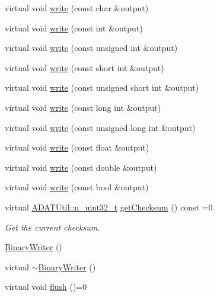 \begin{DoxyCompactItemize}
\item 
virtual void \mbox{\hyperlink{classADATIO_1_1BinaryWriter_aff26660b47d90f1ccfcd8ae06888d95b}{write}} (const char \&output)
\item 
virtual void \mbox{\hyperlink{classADATIO_1_1BinaryWriter_aa7f3e0aa4623cb869b521030d2d1dc06}{write}} (const int \&output)
\item 
virtual void \mbox{\hyperlink{classADATIO_1_1BinaryWriter_a6d173f658b059805cf3d0fdc12a11191}{write}} (const unsigned int \&output)
\item 
virtual void \mbox{\hyperlink{classADATIO_1_1BinaryWriter_a3a4912b7ed1a8ffffdf4e0aa3f19e7fe}{write}} (const short int \&output)
\item 
virtual void \mbox{\hyperlink{classADATIO_1_1BinaryWriter_a2ef22023354822ab259877e9649a5dd9}{write}} (const unsigned short int \&output)
\item 
virtual void \mbox{\hyperlink{classADATIO_1_1BinaryWriter_a7d3cf1640580585b50d633721be0fc53}{write}} (const long int \&output)
\item 
virtual void \mbox{\hyperlink{classADATIO_1_1BinaryWriter_a910c693d6cf8cc4c15594d5204f2d313}{write}} (const unsigned long int \&output)
\item 
virtual void \mbox{\hyperlink{classADATIO_1_1BinaryWriter_ab4d21b75feacec9d85dee103d98665e0}{write}} (const float \&output)
\item 
virtual void \mbox{\hyperlink{classADATIO_1_1BinaryWriter_a8f0cf8c22a53f003ff011b668f346b57}{write}} (const double \&output)
\item 
virtual void \mbox{\hyperlink{classADATIO_1_1BinaryWriter_abe9d55160bf0f28a4c8669650465adf7}{write}} (const bool \&output)
\item 
virtual \mbox{\hyperlink{namespaceADATUtil_ad945a8afa4db2d1f89b731964adae97e}{A\+D\+A\+T\+Util\+::n\+\_\+uint32\+\_\+t}} \mbox{\hyperlink{classADATIO_1_1BinaryWriter_a8bebb70a7248b14c8a4dcf7aa49c1503}{get\+Checksum}} () const =0
\begin{DoxyCompactList}\small\item\em Get the current checksum. \end{DoxyCompactList}\item 
\mbox{\hyperlink{classADATIO_1_1BinaryWriter_ab3eb202f6fb06059cf4dd2eba12280cf}{Binary\+Writer}} ()
\item 
virtual \mbox{\hyperlink{classADATIO_1_1BinaryWriter_a1c72b62cb3f48829de9f79f88ba618fd}{$\sim$\+Binary\+Writer}} ()
\item 
virtual void \mbox{\hyperlink{classADATIO_1_1BinaryWriter_a1d335eeed64094b8641f3ebf731c981e}{flush}} ()=0

\end{DoxyCompactItemize}
